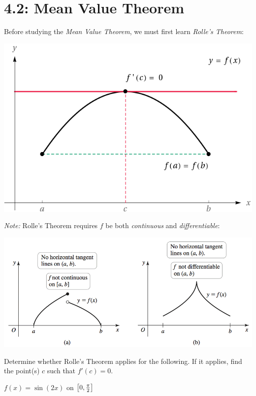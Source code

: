 \documentclass[mathNotesPreamble]{subfiles}
\begin{document}
\section{4.2: Mean Value Theorem}
Before studying the \textit{Mean Value Theorem}, we must first learn \textit{Rolle's Theorem}:\\

\noindent
{}

\begin{center}
  \includegraphics[width=0.3\linewidth]{images/briggs_04_02/RollesThm01.png}
\end{center}

\textit{Note:} Rolle's Theorem requires $f$ be both \textit{continuous} and \textit{differentiable}:
\begin{center}
  \includegraphics[width=0.6\linewidth]{images/briggs_04_02/RollesThm02.png}
\end{center}

\begin{ex*}
  Determine whether Rolle's Theorem applies for the following. If it applies, find the point(s) $c$ such that $f'(c)=0$.
\end{ex*}
$f(x)=\sin(2x)$ on ${\left[0, \frac{\pi}{2}\right]}$
\pagebreak

\noindent
{}
\end{document}
